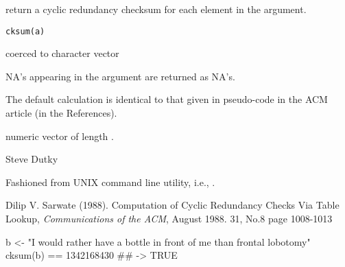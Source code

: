 \begin{Description}\relax
return a cyclic redundancy checksum for each element in the argument.
\end{Description}
\begin{Usage}
\begin{verbatim}
cksum(a)
\end{verbatim}
\end{Usage}
\begin{Arguments}
\begin{ldescription}
\item[\code{a}] coerced to character vector
\end{ldescription}
\end{Arguments}
\begin{Details}\relax
NA's appearing in the argument are returned as NA's.

The default calculation is identical to that given in pseudo-code in the
ACM article (in the References).
\end{Details}
\begin{Value}
numeric vector of length .
\end{Value}
\begin{Author}\relax
Steve Dutky 
\end{Author}
\begin{References}\relax
Fashioned from  UNIX command line utility, i.e.,
.

Dilip V. Sarwate (1988).
Computation of Cyclic Redundancy Checks Via Table Lookup,
\emph{Communications of the ACM}, August 1988.
 31, No.8  page 1008-1013
\end{References}
\begin{Examples}
\begin{ExampleCode}
   b <- "I would rather have a bottle in front of me than frontal lobotomy\n"
   cksum(b) == 1342168430 ## -> TRUE
\end{ExampleCode}
\end{Examples}

